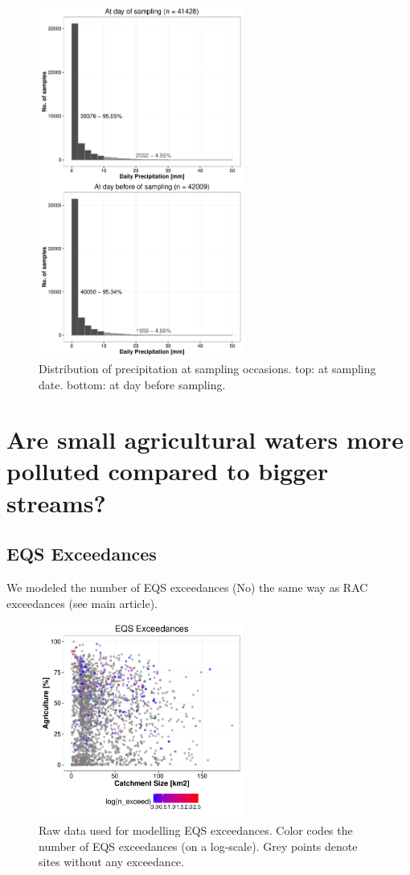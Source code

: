 \documentclass[pdftex,a4paper]{scrreprt}
\begin{document}
\begin{figure}[h]
	\centering
	\includegraphics[width = 0.6\textwidth]{precip}
	\caption{Distribution of precipitation at sampling occasions. top: at sampling date. bottom: at day before sampling.}
	\label{fig:precip}
\end{figure}


\chapter{Are small agricultural waters more polluted compared to bigger streams?}

\section{EQS Exceedances}
We modeled the number of EQS exceedances (No) the same way as RAC exceedances (see main article).


\begin{figure}[h]
	\centering
	\includegraphics[width = 0.6\textwidth]{ezgagrieqs}
	\caption{Raw data used for modelling EQS exceedances. Color codes the number of EQS exceedances (on a log-scale). Grey points denote sites without any exceedance.}
	\label{fig:ezgagrieqs}
\end{figure}
\end{document}
